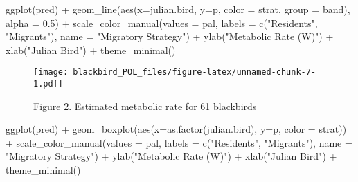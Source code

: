 \documentclass[
]{article}
\newenvironment{Shaded}{\begin{snugshade}}{\end{snugshade}}
\newcommand{\AttributeTok}[1]{\textcolor[rgb]{0.77,0.63,0.00}{#1}}
\newcommand{\FloatTok}[1]{\textcolor[rgb]{0.00,0.00,0.81}{#1}}
\newcommand{\FunctionTok}[1]{\textcolor[rgb]{0.00,0.00,0.00}{#1}}
\newcommand{\NormalTok}[1]{#1}
\newcommand{\SpecialCharTok}[1]{\textcolor[rgb]{0.00,0.00,0.00}{#1}}
\newcommand{\StringTok}[1]{\textcolor[rgb]{0.31,0.60,0.02}{#1}}
\begin{document}
\begin{Shaded}
\begin{Highlighting}[]
\FunctionTok{ggplot}\NormalTok{(pred) }\SpecialCharTok{+} 
  \FunctionTok{geom\_line}\NormalTok{(}\FunctionTok{aes}\NormalTok{(}\AttributeTok{x=}\NormalTok{julian.bird, }\AttributeTok{y=}\NormalTok{p, }\AttributeTok{color =}\NormalTok{ strat, }\AttributeTok{group =}\NormalTok{ band), }\AttributeTok{alpha =} \FloatTok{0.5}\NormalTok{) }\SpecialCharTok{+}
  \FunctionTok{scale\_color\_manual}\NormalTok{(}\AttributeTok{values =}\NormalTok{ pal, }\AttributeTok{labels =} \FunctionTok{c}\NormalTok{(}\StringTok{"Residents"}\NormalTok{, }\StringTok{"Migrants"}\NormalTok{),}
                     \AttributeTok{name =} \StringTok{"Migratory Strategy"}\NormalTok{) }\SpecialCharTok{+}
  \FunctionTok{ylab}\NormalTok{(}\StringTok{"Metabolic Rate (W)"}\NormalTok{) }\SpecialCharTok{+}
  \FunctionTok{xlab}\NormalTok{(}\StringTok{"Julian Bird"}\NormalTok{) }\SpecialCharTok{+}
  \FunctionTok{theme\_minimal}\NormalTok{()}
\end{Highlighting}
\end{Shaded}

\begin{figure}
\centering
\texttt{[image: blackbird\_POL\_files/figure-latex/unnamed-chunk-7-1.pdf]}
\caption{Figure 2. Estimated metabolic rate for 61 blackbirds}
\end{figure}

\begin{Shaded}
\begin{Highlighting}[]
\FunctionTok{ggplot}\NormalTok{(pred) }\SpecialCharTok{+} 
  \FunctionTok{geom\_boxplot}\NormalTok{(}\FunctionTok{aes}\NormalTok{(}\AttributeTok{x=}\FunctionTok{as.factor}\NormalTok{(julian.bird), }\AttributeTok{y=}\NormalTok{p, }\AttributeTok{color =}\NormalTok{ strat)) }\SpecialCharTok{+}
  \FunctionTok{scale\_color\_manual}\NormalTok{(}\AttributeTok{values =}\NormalTok{ pal, }\AttributeTok{labels =} \FunctionTok{c}\NormalTok{(}\StringTok{"Residents"}\NormalTok{, }\StringTok{"Migrants"}\NormalTok{),}
                     \AttributeTok{name =} \StringTok{"Migratory Strategy"}\NormalTok{) }\SpecialCharTok{+}
  \FunctionTok{ylab}\NormalTok{(}\StringTok{"Metabolic Rate (W)"}\NormalTok{) }\SpecialCharTok{+}
  \FunctionTok{xlab}\NormalTok{(}\StringTok{"Julian Bird"}\NormalTok{) }\SpecialCharTok{+}
  \FunctionTok{theme\_minimal}\NormalTok{()}
\end{Highlighting}
\end{Shaded}
\end{document}
